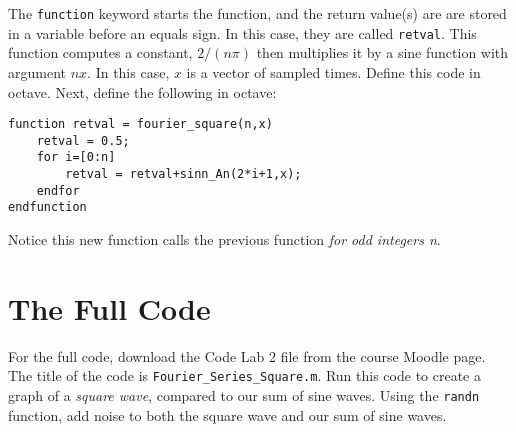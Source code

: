\documentclass[12pt]{article}
\begin{document}
The \verb+function+ keyword starts the function, and the return value(s) are are stored in a variable before an equals sign.  In this case, they are called \verb+retval+.  This function computes a constant, $2/(n\pi)$ then multiplies it by a sine function with argument $nx$.  In this case, $x$ is a vector of sampled times.  Define this code in octave.  Next, define the following in octave:

\begin{verbatim}
function retval = fourier_square(n,x)
    retval = 0.5;
    for i=[0:n]
        retval = retval+sinn_An(2*i+1,x);
    endfor
endfunction
\end{verbatim}

Notice this new function calls the previous function \textit{for odd integers n}.

\section{The Full Code}

For the full code, download the Code Lab 2 file from the course Moodle page.  The title of the code is \verb+Fourier_Series_Square.m+.  Run this code to create a graph of a \textit{square wave}, compared to our sum of sine waves.  Using the \verb+randn+ function, add noise to both the square wave and our sum of sine waves.
\end{document}
